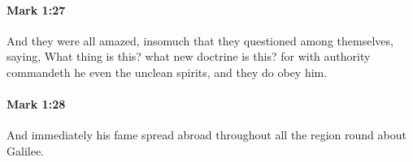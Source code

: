 		\paragraph{Mark 1:27} %
			\label{MARK-1-27}

			And they were all amazed, insomuch that they questioned among themselves, saying, What thing is this? what new doctrine is this? for with authority commandeth he even the unclean spirits, and they do obey him.

			\begin{framed}
			\scriptsize
				\begin{compactdesc}
					\item[SBLG]  \hyperref[EXOUSIA]{} 
				\end{compactdesc}
			\end{framed}

		\paragraph{Mark 1:28} %
			\label{MARK-1-28}

			And immediately his fame spread abroad throughout all the region round about Galilee.

